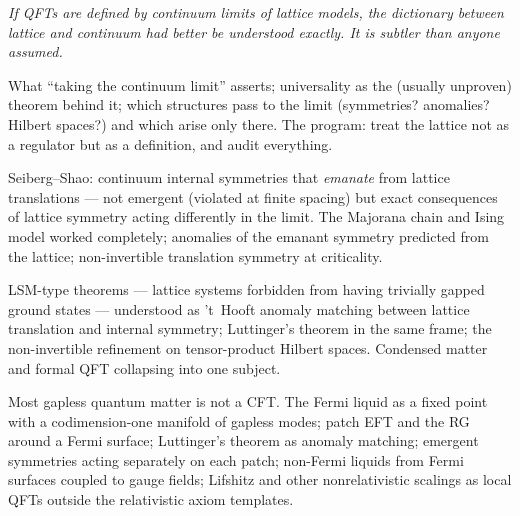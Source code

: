 
\noin \emph{If QFTs are defined by continuum limits of lattice models, the dictionary between lattice and continuum had better be understood exactly. It is subtler than anyone assumed.}

What ``taking the continuum limit'' asserts; universality as the (usually unproven) theorem behind it; which structures pass to the limit (symmetries? anomalies? Hilbert spaces?) and which arise only there. The program: treat the lattice not as a regulator but as a definition, and audit everything.

Seiberg--Shao: continuum internal symmetries that \emph{emanate} from lattice translations --- not emergent (violated at finite spacing) but exact consequences of lattice symmetry acting differently in the limit. The Majorana chain and Ising model worked completely; anomalies of the emanant symmetry predicted from the lattice; non-invertible translation symmetry at criticality.

LSM-type theorems --- lattice systems forbidden from having trivially gapped ground states --- understood as 't~Hooft anomaly matching between lattice translation and internal symmetry; Luttinger's theorem in the same frame; the non-invertible refinement on tensor-product Hilbert spaces. Condensed matter and formal QFT collapsing into one subject.

Most gapless quantum matter is not a CFT. The Fermi liquid as a fixed point with a codimension-one manifold of gapless modes; patch EFT and the RG around a Fermi surface; Luttinger's theorem as anomaly matching; emergent symmetries acting separately on each patch; non-Fermi liquids from Fermi surfaces coupled to gauge fields; Lifshitz and other nonrelativistic scalings as local QFTs outside the relativistic axiom templates.

